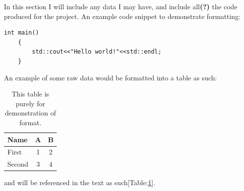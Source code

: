 \documentclass[titlepage]{article}
\begin{document}
In this section I will include any data I may have, and include all\textbf{(?)} the code produced for the project. An example code snippet to demonstrate formatting:\smallskip
\begin{lstlisting}[caption = Hello world example code.]
	int main()
	{
		std::cout<<"Hello world!"<<std::endl;
	}
\end{lstlisting}
\medskip
An example of some raw data would be formatted into a table as such:\\
\begin{table}[h]
	\centering
	\begin{tabular}{|l|c|c|}
		\hline
		\textbf{Name} & \textbf{A} & \textbf{B} \\
		\hline
		First & 1 & 2 \\
		Second & 3 & 4 \\
		\hline
	\end{tabular}
	\caption{\label{tab:appendixTest} This table is purely for demonstration of format.}
\end{table}
and will be referenced in the text as such[Table:\ref{tab:appendixTest}].
\end{document}
